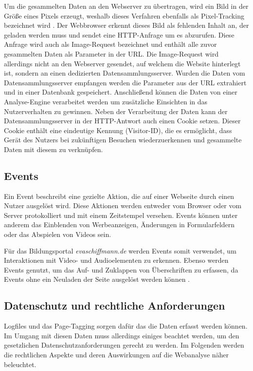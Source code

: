 Um die gesammelten Daten an den Webserver zu übertragen, wird ein Bild in der Größe eines Pixels erzeugt, weshalb dieses Verfahren ebenfalls als Pixel-Tracking bezeichnet wird \parencite[Kap.2.3]{Hassler2019}. Der Webbrowser erkennt dieses Bild als fehlenden Inhalt an, der geladen werden muss und sendet eine HTTP-Anfrage um es abzurufen. Diese Anfrage wird auch als Image-Request bezeichnet und enthält alle zuvor gesammelten Daten als Parameter in der URL. Die Image-Request wird allerdings nicht an den Webserver gesendet, auf welchem die Website hinterlegt ist, sondern an einen dedizierten Datensammlungsserver. Wurden die Daten vom Datensammlungsserver empfangen werden die Parameter aus der URL extrahiert und in einer Datenbank gespeichert. Anschließend können die Daten von einer Analyse-Engine verarbeitet werden um zusätzliche Einsichten in das Nutzerverhalten zu gewinnen. Neben der Verarbeitung der Daten kann der Datensammlungsserver in der HTTP-Antwort auch einen Cookie setzen. Dieser Cookie enthält eine eindeutige Kennung (Visitor-ID), die es ermöglicht, dass Gerät des Nutzers bei zukünftigen Besuchen wiederzuerkennen und gesammelte Daten mit diesem zu verknüpfen. \parencite[S.70-72]{Dykes2014}

\subsection{Events}
\label{sec:events}
Ein Event beschreibt eine gezielte Aktion, die auf einer Webseite durch einen Nutzer ausgelöst wird. Diese Aktionen werden entweder vom Browser oder vom Server protokolliert und mit einem Zeitstempel versehen. Events können unter anderem das Einblenden von Werbeanzeigen, Änderungen in Formularfeldern oder das Abspielen von Videos sein. \parencite[S.13]{WAA2008}

Für das Bildungsportal \textit{evaschiffmann.de} werden Events somit verwendet, um Interaktionen mit Video- und Audioelementen zu erkennen. Ebenso werden Events genutzt, um das Auf- und Zuklappen von Überschriften zu erfassen, da Events ohne ein Neuladen der Seite ausgelöst werden können \parencite{ATInternet}.

\subsection{Datenschutz und rechtliche Anforderungen}
\label{sec:datenschutz}
Logfiles und das Page-Tagging sorgen dafür das die Daten erfasst werden können. Im Umgang mit diesen Daten muss allerdings einiges beachtet werden, um den gesetzlichen Datenschutzanforderungen gerecht zu werden. Im Folgenden werden die rechtlichen Aspekte und deren Auswirkungen auf die Webanalyse näher beleuchtet.

